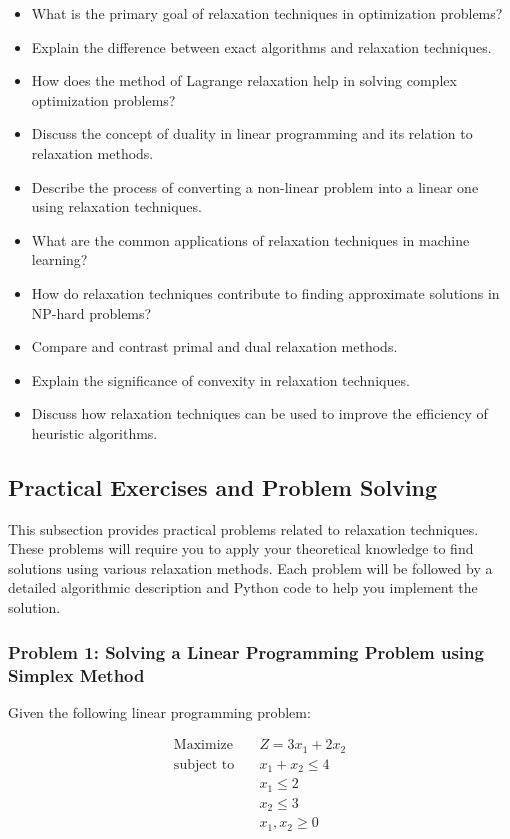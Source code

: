 \documentclass[12pt]{book} %
\begin{document}
\begin{itemize}
    \item What is the primary goal of relaxation techniques in optimization problems?
    \item Explain the difference between exact algorithms and relaxation techniques.
    \item How does the method of Lagrange relaxation help in solving complex optimization problems?
    \item Discuss the concept of duality in linear programming and its relation to relaxation methods.
    \item Describe the process of converting a non-linear problem into a linear one using relaxation techniques.
    \item What are the common applications of relaxation techniques in machine learning?
    \item How do relaxation techniques contribute to finding approximate solutions in NP-hard problems?
    \item Compare and contrast primal and dual relaxation methods.
    \item Explain the significance of convexity in relaxation techniques.
    \item Discuss how relaxation techniques can be used to improve the efficiency of heuristic algorithms.
\end{itemize}

\subsection{Practical Exercises and Problem Solving}
This subsection provides practical problems related to relaxation techniques. These problems will require you to apply your theoretical knowledge to find solutions using various relaxation methods. Each problem will be followed by a detailed algorithmic description and Python code to help you implement the solution.

\subsubsection*{Problem 1: Solving a Linear Programming Problem using Simplex Method}
Given the following linear programming problem:

\begin{align*}
\text{Maximize} \quad & Z = 3x_1 + 2x_2 \\
\text{subject to} \quad & x_1 + x_2 \leq 4 \\
& x_1 \leq 2 \\
& x_2 \leq 3 \\
& x_1, x_2 \geq 0
\end{align*}
\end{document}
